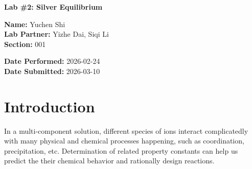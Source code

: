 \documentclass[12pt]{article}
\begin{document}
\begin{center}
    \Large \textbf{Lab \#2: Silver Equilibrium}
\end{center}
\vspace{0.5em}

\begin{minipage}[t]{0.5\textwidth}
    \small
    \textbf{Name:} Yuchen Shi \\
    \textbf{Lab Partner:} Yizhe Dai, Siqi Li \\ 
    \textbf{Section:} 001
\end{minipage}%
\begin{minipage}[t]{0.5\textwidth}
    \small \raggedleft
    \textbf{Date Performed:} 2026-02-24 \\ 
    \textbf{Date Submitted:} 2026-03-10 
\end{minipage}
\vspace{1.5em}

\begin{abstract}
In this experiment, the equilibrium of silver ion with chloride ion, iodide, and ammonia were studied by monitoring the time dependent electric potential curve of a electrochemical cell with Cu and Ag as electrodes. $1.00\times10^{-4}$ M AgNO$_3$ solution was used to determine the cell constant. With potential stabilized, NH$_4$Cl, three portions of NH$_3$, and KI solution were added to determine silver concentrations and the Nernst equation. Debye-Huckel corrections were used to obtain solubility products for AgCl and AgI. A linear fit of $\log([\mathrm{Ag(NH_3)_p^+}]/[\mathrm{Ag^+}])$ versus $\log[NH_3]$ was used to estimate the coordination number and formation constant of the silver-ammonia complex. The calculated properties from experimental data were $K_{sp}(\mathrm{AgCl})=(1.375\pm0.1050)\times10^{-10}$ with an error rate of 22.32 \% , $K_{sp}(\mathrm{AgI})=(6.872\pm0.2277)\times10^{-17}$ with an error rate of 19.34 \% , and $K_f=(3.956\pm0.4929)\times10^{7}$ with 95\% confidence and an error rate of 147.3 \% . The linear regression confirmed $p=2.104\pm0.04850$, indicating that the dominant complex was [Ag(NH$_3$)$_2$]$^+$.
\end{abstract}


\section*{Introduction}
In a multi-component solution, different species of ions interact complicatedly with many physical and chemical processes happening, such as coordination, precipitation, etc. Determination of related property constants can help us predict the their chemical behavior and rationally design reactions.
\end{document}
